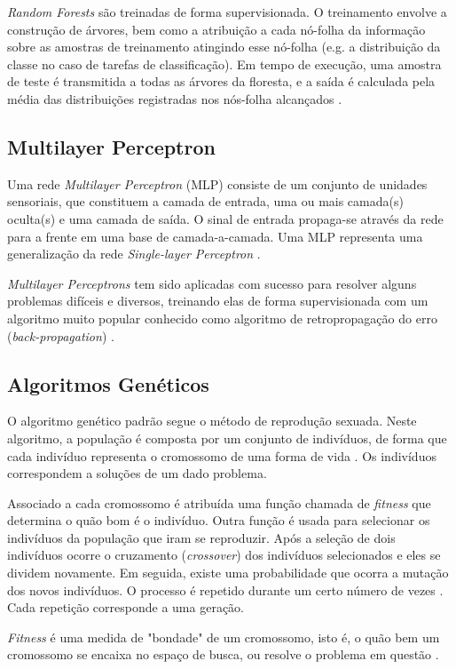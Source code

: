 \documentclass[conference]{IEEEtran}
\begin{document}
{\it Random Forests} são treinadas de forma supervisionada. O treinamento envolve a construção de árvores, bem como a atribuição a cada nó-folha da informação sobre as amostras de treinamento atingindo esse nó-folha (e.g. a distribuição da classe no caso de tarefas de classificação). Em tempo de execução, uma amostra de teste é transmitida a todas as árvores da floresta, e a saída é calculada pela média das distribuições registradas nos nós-folha alcançados \cite{IEEEhowto:lempitsky}.
\subsection{Multilayer Perceptron}
Uma rede {\it Multilayer Perceptron} (MLP) consiste de um conjunto de unidades sensoriais, que constituem a camada de entrada, uma ou mais camada(s) oculta(s) e uma camada de saída. O sinal de entrada propaga-se através da rede para a frente em uma base de camada-a-camada. Uma MLP representa uma generalização da rede {\it Single-layer Perceptron} \cite{IEEEhowto:haykin}.

{\it Multilayer Perceptrons} tem sido aplicadas com sucesso para resolver alguns problemas difíceis e diversos, treinando elas de forma supervisionada com um algoritmo muito popular conhecido como algoritmo de retropropagação do erro ({\it back-propagation}) \cite{IEEEhowto:haykin}.

\subsection{Algoritmos Genéticos}

O algoritmo genético padrão segue o método de reprodução sexuada. Neste algoritmo, a população é composta por um conjunto de indivíduos, de forma que cada indivíduo representa o cromossomo de uma forma de vida \cite{IEEEhowto:prebys}. Os indivíduos correspondem a soluções de um dado problema.

Associado a cada cromossomo é atribuída uma função chamada de \textit{fitness} que determina o quão bom é o indivíduo. Outra função é usada para selecionar os indivíduos da população que iram se reproduzir. Após a seleção de dois indivíduos ocorre o cruzamento ({\it crossover}) dos indivíduos selecionados e eles se dividem novamente. Em seguida, existe uma probabilidade que ocorra a mutação dos novos indivíduos. O processo é repetido durante um certo número de vezes \cite{IEEEhowto:prebys}. Cada repetição corresponde a uma geração. 

\textit{Fitness} é uma medida de "bondade" de um cromossomo, isto é, o quão bem um cromossomo se encaixa no espaço de busca, ou resolve o problema em questão \cite{IEEEhowto:prebys}.
\end{document}

